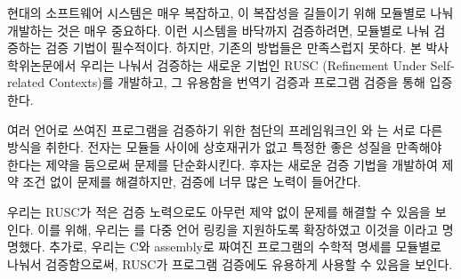 
\begin{abstractalt}
현대의 소프트웨어 시스템은 매우 복잡하고, 이 복잡성을 길들이기 위해 모듈별로 나눠 개발하는 것은 매우 중요하다.
이런 시스템을 바닥까지 검증하려면, 모듈별로 나눠 검증하는 검증 기법이 필수적이다.
하지만, 기존의 방법들은 만족스럽지 못하다.
본 박사학위논문에서 우리는 나눠서 검증하는 새로운 기법인 RUSC (Refinement
Under Self-related Contexts)를 개발하고, 그 유용함을 번역기 검증과 프로그램 검증을 통해 입증한다.

여러 언어로 쓰여진 프로그램을 검증하기 위한 첨단의 프레임워크인 \ccx{}와 \ccc{}는 서로 다른 방식을 취한다.
전자는 모듈들 사이에 상호재귀가 없고 특정한 좋은 성질을 만족해야 한다는 제약을 둠으로써 문제를 단순화시킨다.
후자는 새로운 검증 기법을 개발하여 제약 조건 없이 문제를 해결하지만, 검증에 너무 많은 노력이 들어간다.

우리는 RUSC가 적은 검증 노력으로도 아무런 제약 없이 문제를 해결할 수 있음을 보인다.
이를 위해, 우리는 \cc{}를 다중 언어 링킹을 지원하도록 확장하였고 이것을 \ccm{}이라고 명명했다.
추가로, 우리는 C와 assembly로 짜여진 프로그램의 수학적 명세를 모듈별로 나눠서 검증함으로써, RUSC가 프로그램 검증에도 유용하게 사용할 수 있음을 보인다.

\end{abstractalt}
